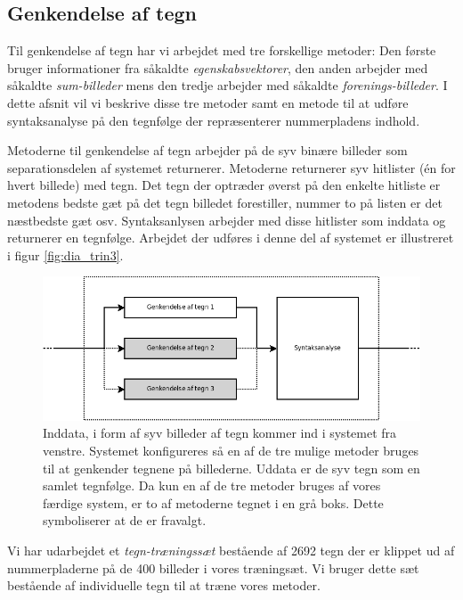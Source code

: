 \subsection{Genkendelse af tegn}
\label{sec_monster}

Til genkendelse af tegn har vi arbejdet med tre forskellige metoder: Den første bruger informationer fra såkaldte \textit{egenskabsvektorer}, den anden arbejder med såkaldte \textit{sum-billeder} mens den tredje arbejder med såkaldte \textit{forenings-billeder}. I dette afsnit vil vi beskrive disse tre metoder samt en metode til at udføre syntaksanalyse på den tegnfølge der repræsenterer nummerpladens indhold.

Metoderne til genkendelse af tegn arbejder på de syv binære billeder som separationsdelen af systemet returnerer. Metoderne returnerer syv hitlister (én for hvert billede) med tegn. Det tegn der optræder øverst på den enkelte hitliste er metodens bedste gæt på det tegn billedet forestiller, nummer to på listen er det næstbedste gæt osv. Syntaksanlysen arbejder med disse hitlister som inddata og returnerer en tegnfølge. Arbejdet der udføres i denne del af systemet er illustreret i figur \vref{fig:dia_trin3}.

\begin{figure}[htp]
\centering
\includegraphics[width=12cm]{system/illu/dia_trin3.png} 
\caption{Inddata, i form af syv billeder af tegn kommer ind i systemet fra venstre. Systemet konfigureres så en af de tre mulige metoder bruges til at genkender tegnene på billederne. Uddata er de syv tegn som en samlet tegnfølge. Da kun en af de tre metoder bruges af vores færdige system, er to af metoderne tegnet i en grå boks. Dette symboliserer at de er fravalgt.}
\label{fig:dia_trin3}
\end{figure}

Vi har udarbejdet et \textit{tegn-træningssæt} bestående af 2692 tegn der er klippet ud af nummerpladerne på de 400 billeder i vores træningsæt. Vi bruger dette sæt bestående af individuelle tegn til at træne vores metoder.


